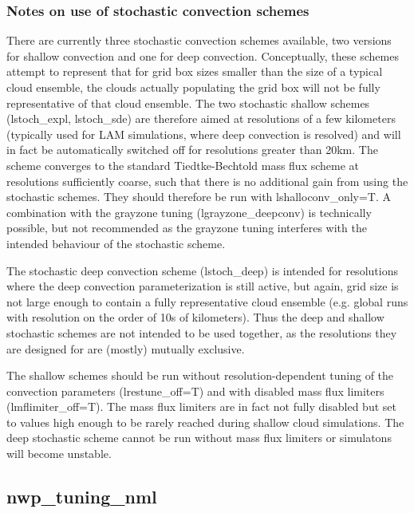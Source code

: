 \subsubsection{Notes on use of stochastic convection schemes}
There are currently three stochastic convection schemes available, two versions for shallow convection and one for deep convection. Conceptually, these schemes attempt to represent that for grid box sizes smaller than the size of a typical cloud ensemble, the clouds actually populating the grid box will not be fully representative of that cloud ensemble.
The two stochastic shallow schemes (lstoch\_expl, lstoch\_sde) are therefore aimed at resolutions of a few kilometers (typically used for LAM simulations, where deep convection is resolved) and will in fact be automatically switched off for resolutions greater than 20km. The scheme converges to the standard Tiedtke-Bechtold mass flux scheme at resolutions sufficiently coarse, such that there is no additional gain from using the stochastic schemes. They should therefore be run with lshalloconv\_only=T. A combination with the grayzone tuning (lgrayzone\_deepconv) is technically possible, but not recommended as the grayzone tuning interferes with the intended behaviour of the stochastic scheme. 

The stochastic deep convection scheme (lstoch\_deep) is intended for resolutions where the deep convection parameterization is still active, but again, grid size is not large enough to contain a fully representative cloud ensemble (e.g. global runs with resolution on the order of 10s of kilometers). Thus the deep and shallow stochastic schemes are not intended to be used together, as the resolutions they are designed for are (mostly) mutually exclusive.

The shallow schemes should be run without resolution-dependent tuning of the convection parameters (lrestune\_off=T) and with disabled mass flux limiters (lmflimiter\_off=T). The mass flux limiters are in fact not fully disabled but set to values high enough to be rarely reached during shallow cloud simulations.
The deep stochastic scheme cannot be run without mass flux limiters or simulatons will become unstable.

\subsection{nwp\_tuning\_nml}

